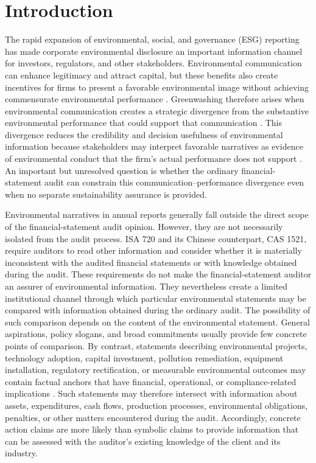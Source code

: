 \documentclass[11pt]{article}
\begin{document}
\section{Introduction}

The rapid expansion of environmental, social, and governance (ESG) reporting has made corporate environmental disclosure an important information channel for investors, regulators, and other stakeholders.
Environmental communication can enhance legitimacy and attract capital, but these benefits also create incentives for firms to present a favorable environmental image without achieving commensurate environmental performance \citep{delmas2011drivers}.
Greenwashing therefore arises when environmental communication creates a strategic divergence from the substantive environmental performance that could support that communication \citep{lyon2011greenwash,zhou2024environmental}.
This divergence reduces the credibility and decision usefulness of environmental information because stakeholders may interpret favorable narratives as evidence of environmental conduct that the firm's actual performance does not support \citep{christensen2021mandatory,zhou2024environmental}.
An important but unresolved question is whether the ordinary financial-statement audit can constrain this communication--performance divergence even when no separate sustainability assurance is provided.

Environmental narratives in annual reports generally fall outside the direct scope of the financial-statement audit opinion.
However, they are not necessarily isolated from the audit process.
ISA 720 and its Chinese counterpart, CAS 1521, require auditors to read other information and consider whether it is materially inconsistent with the audited financial statements or with knowledge obtained during the audit.
These requirements do not make the financial-statement auditor an assurer of environmental information.
They nevertheless create a limited institutional channel through which particular environmental statements may be compared with information obtained during the ordinary audit.
The possibility of such comparison depends on the content of the environmental statement.
General aspirations, policy slogans, and broad commitments usually provide few concrete points of comparison.
By contrast, statements describing environmental projects, technology adoption, capital investment, pollution remediation, equipment installation, regulatory rectification, or measurable environmental outcomes may contain factual anchors that have financial, operational, or compliance-related implications \citep{clarkson2004market,clarkson2008revisiting,barth1994estimation}.
Such statements may therefore intersect with information about assets, expenditures, cash flows, production processes, environmental obligations, penalties, or other matters encountered during the audit.
Accordingly, concrete action claims are more likely than symbolic claims to provide information that can be assessed with the auditor's existing knowledge of the client and its industry.
\end{document}
